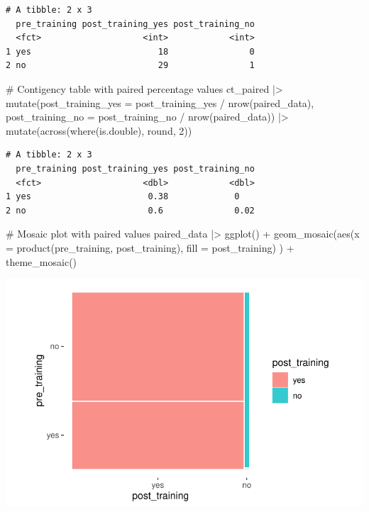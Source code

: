 \documentclass[
  letterpaper,
]{krantz}
\makeatletter
\newenvironment{Shaded}{\begin{snugshade}}{\end{snugshade}}
\newcommand{\AttributeTok}[1]{\textcolor[rgb]{0.40,0.45,0.13}{#1}}
\newcommand{\CommentTok}[1]{\textcolor[rgb]{0.37,0.37,0.37}{#1}}
\newcommand{\DecValTok}[1]{\textcolor[rgb]{0.68,0.00,0.00}{#1}}
\newcommand{\FunctionTok}[1]{\textcolor[rgb]{0.28,0.35,0.67}{#1}}
\newcommand{\NormalTok}[1]{\textcolor[rgb]{0.00,0.23,0.31}{#1}}
\newcommand{\SpecialCharTok}[1]{\textcolor[rgb]{0.37,0.37,0.37}{#1}}
\newenvironment{kframe}{%
\medskip{}
\setlength{\fboxsep}{.8em}
 \def\at@end@of@kframe{}%
 \ifinner\ifhmode%
  \def\at@end@of@kframe{\end{minipage}}%
  \begin{minipage}{\columnwidth}%
 \fi\fi%
 \def\FrameCommand##1{\hskip\@totalleftmargin \hskip-\fboxsep
 \colorbox{shadecolor}{##1}\hskip-\fboxsep
     \hskip-\linewidth \hskip-\@totalleftmargin \hskip\columnwidth}%
 \MakeFramed {\advance\hsize-\width
   \@totalleftmargin\z@ \linewidth\hsize
   \@setminipage}}%
 {\par\unskip\endMakeFramed%
 \at@end@of@kframe}
\renewenvironment{Shaded}{\begin{kframe}}{\end{kframe}}
\makeatother
\begin{document}
\begin{verbatim}
# A tibble: 2 x 3
  pre_training post_training_yes post_training_no
  <fct>                    <int>            <int>
1 yes                         18                0
2 no                          29                1
\end{verbatim}

\begin{Shaded}
\begin{Highlighting}[]
\CommentTok{\# Contigency table with paired percentage values}
\NormalTok{ct\_paired }\SpecialCharTok{|\textgreater{}}
  \FunctionTok{mutate}\NormalTok{(}\AttributeTok{post\_training\_yes =}\NormalTok{ post\_training\_yes }\SpecialCharTok{/} \FunctionTok{nrow}\NormalTok{(paired\_data),}
         \AttributeTok{post\_training\_no =}\NormalTok{ post\_training\_no }\SpecialCharTok{/} \FunctionTok{nrow}\NormalTok{(paired\_data)) }\SpecialCharTok{|\textgreater{}}
  \FunctionTok{mutate}\NormalTok{(}\FunctionTok{across}\NormalTok{(}\FunctionTok{where}\NormalTok{(is.double), round, }\DecValTok{2}\NormalTok{))}
\end{Highlighting}
\end{Shaded}

\begin{verbatim}
# A tibble: 2 x 3
  pre_training post_training_yes post_training_no
  <fct>                    <dbl>            <dbl>
1 yes                       0.38             0   
2 no                        0.6              0.02
\end{verbatim}

\begin{Shaded}
\begin{Highlighting}[]
\CommentTok{\# Mosaic plot with paired values}
\NormalTok{paired\_data }\SpecialCharTok{|\textgreater{}}
  \FunctionTok{ggplot}\NormalTok{() }\SpecialCharTok{+}
  \FunctionTok{geom\_mosaic}\NormalTok{(}\FunctionTok{aes}\NormalTok{(}\AttributeTok{x =} \FunctionTok{product}\NormalTok{(pre\_training, post\_training),}
                  \AttributeTok{fill =}\NormalTok{ post\_training)}
\NormalTok{              ) }\SpecialCharTok{+}
  \FunctionTok{theme\_mosaic}\NormalTok{()}
\end{Highlighting}
\end{Shaded}

\includegraphics{11_group_comparison_files/figure-pdf/mosaic-plot-paired-pre-post-training-1.pdf}
\end{document}
